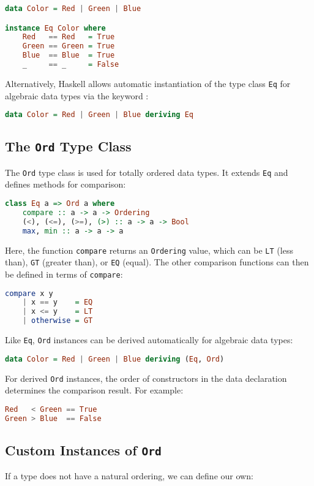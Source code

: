 \begin{lstlisting}[style=haskellstyle, language=Haskell]
data Color = Red | Green | Blue

instance Eq Color where
    Red   == Red   = True
    Green == Green = True
    Blue  == Blue  = True
    _     == _     = False
\end{lstlisting}
Alternatively, Haskell allows automatic instantiation of the type class \texttt{Eq} for algebraic data types
via the keyword : 
\begin{lstlisting}[style=haskellstyle, language=Haskell]
data Color = Red | Green | Blue deriving Eq
\end{lstlisting}

\subsection{The \texttt{Ord} Type Class}
The \texttt{Ord} type class is used for totally ordered data types. It extends \texttt{Eq} and defines methods
for comparison: 
\begin{lstlisting}[style=haskellstyle, language=Haskell]
class Eq a => Ord a where
    compare :: a -> a -> Ordering
    (<), (<=), (>=), (>) :: a -> a -> Bool
    max, min :: a -> a -> a
\end{lstlisting}
Here, the function \texttt{compare} returns an \texttt{Ordering} value, which can be \texttt{LT} (less than),
\texttt{GT} (greater than), or \texttt{EQ} (equal).  The other comparison functions can then be defined in
terms of \texttt{compare}: 
\begin{lstlisting}[style=haskellstyle, language=Haskell]
compare x y
    | x == y    = EQ
    | x <= y    = LT
    | otherwise = GT
\end{lstlisting}
Like \texttt{Eq}, \texttt{Ord} instances can be derived automatically for algebraic data types:
\begin{lstlisting}[style=haskellstyle, language=Haskell]
data Color = Red | Green | Blue deriving (Eq, Ord)
\end{lstlisting}
For derived \texttt{Ord} instances, the order of constructors in the data declaration determines the comparison
result. For example: 
\begin{lstlisting}[style=haskellstyle, language=Haskell]
Red   < Green == True
Green > Blue  == False
\end{lstlisting}

\subsection{Custom Instances of \texttt{Ord}}
If a type does not have a natural ordering, we can define our own:

